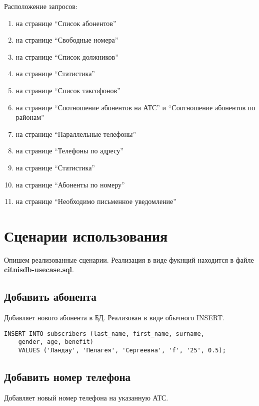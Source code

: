 \documentclass{report}
\begin{document}
Расположение запросов:
\begin{enumerate}
    \item на странице ``Список абонентов''
    \item на странице ``Свободные номера''
    \item на странице ``Список должников''
    \item на странице ``Статистика''
    \item на странице ``Список таксофонов''
    \item на странице ``Соотношение абонентов на АТС'' и ``Соотношение абонентов по районам''
    \item на странице ``Параллельные телефоны''
    \item на странице ``Телефоны по адресу''
    \item на странице ``Статистика''
    \item на странице ``Абоненты по номеру''
    \item на странице ``Необходимо письменное уведомление''
\end{enumerate}

\section{Сценарии использования}

Опишем реализованные сценарии. Реализация в виде
фукнций находится в файле \textbf{citnisdb-usecase.sql}.

\subsection*{Добавить абонента}

Добавляет нового абонента в БД. Реализован в виде обычного INSERT.

\begin{lstlisting}
INSERT INTO subscribers (last_name, first_name, surname, 
    gender, age, benefit)
	VALUES ('Ландау', 'Пелагея', 'Сергеевна', 'f', '25', 0.5);
\end{lstlisting}

\subsection*{Добавить номер телефона}

Добавляет новый номер телефона на указанную АТС.
\end{document}
